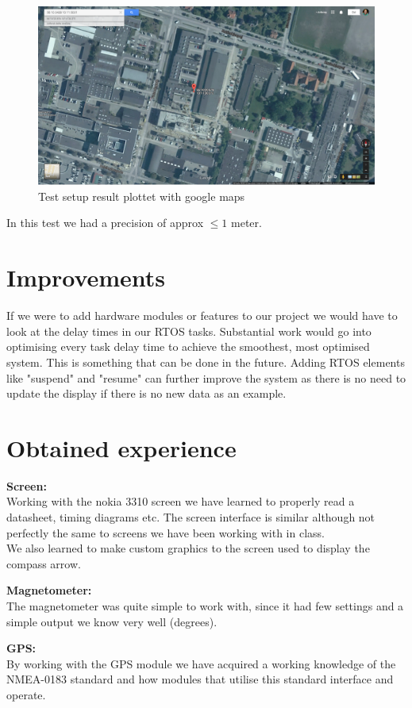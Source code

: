 \begin{figure}[H]
\centering
\includegraphics[width=.9\textwidth]{billeder/coordinate_map}
\caption{Test setup result plottet with google maps}
\end{figure}

In this test we had a precision of approx $\leq1$ meter.

\chapter{Improvements}
If we were to add hardware modules or features to our project we would have to look at the delay times in our RTOS tasks. Substantial work would go into optimising every task delay time to achieve the smoothest, most optimised system. This is something that can be done in the future. Adding RTOS elements like "suspend" and "resume" can further improve the system as there is no need to update the display if there is no new data as an example. \\

\chapter{Obtained experience}
\textbf{Screen:}\\
Working with the nokia 3310 screen we have learned to properly read a datasheet, timing diagrams etc. The screen interface is similar although not perfectly the same to screens we have been working with in class.\\
We also learned to make custom graphics to the screen used to display the compass arrow.

\textbf{Magnetometer:}\\
The magnetometer was quite simple to work with, since it had few settings and a simple output we know very well (degrees).

\textbf{GPS:}\\
By working with the GPS module we have acquired a working knowledge of the NMEA-0183 standard and how modules that utilise this standard interface and operate. 


